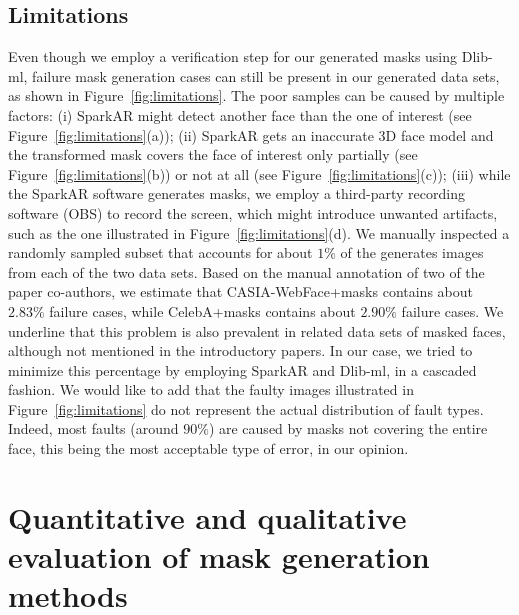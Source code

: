 \documentclass{article}
\begin{document}
\subsection{Limitations}

Even though we employ a verification step for our generated masks using Dlib-ml, failure mask generation cases can still be present in our generated data sets, as shown in Figure~\ref{fig:limitations}. The poor samples can be caused by multiple factors: (i) SparkAR might detect another face than the one of interest (see Figure~\ref{fig:limitations}(a)); (ii) SparkAR gets an inaccurate 3D face model and the transformed mask covers the face of interest only partially (see Figure~\ref{fig:limitations}(b)) or not at all (see Figure~\ref{fig:limitations}(c)); (iii) while the SparkAR software generates masks, we employ a third-party recording software (OBS) to record the screen, which might introduce unwanted artifacts, such as the one illustrated in Figure~\ref{fig:limitations}(d). We manually inspected a randomly sampled subset that accounts for about $1\%$ of the generates images from each of the two data sets. Based on the manual annotation of two of the paper co-authors, we estimate that {CASIA-WebFace+masks} contains about $2.83\%$ failure cases, while {CelebA+masks} contains about $2.90\%$ failure cases. We underline that this problem is also prevalent in related data sets of masked faces, although not mentioned in the introductory papers. In our case, we tried to minimize this percentage by employing SparkAR and Dlib-ml, in a cascaded fashion. We would like to add that the faulty images illustrated in Figure~\ref{fig:limitations} do not represent the actual distribution of fault types. Indeed, most faults (around $90\%$) are caused by masks not covering the entire face, this being the most acceptable type of error, in our opinion. 

\section{Quantitative and qualitative evaluation of mask generation methods}
\label{sec:comparison}
\end{document}
